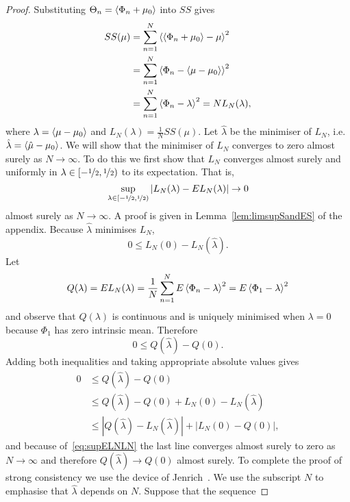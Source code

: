 \documentclass[journal]{../bib/IEEEtran}
\begin{document}
\begin{proof}
Substituting $\Theta_n = \left< \Phi_n + \mu_0 \right>$ into $SS$ gives
\begin{align*}
SS(\mu) &= \sum_{n=1}^{N}{ \left< \left< \Phi_n + \mu_0 \right> - \mu \right>^2 } \\
&= \sum_{n=1}^{N}{ \left< \Phi_n - \left< \mu - \mu_0 \right> \right>^2 } \\
&= \sum_{n=1}^{N}{ \left< \Phi_n - \lambda \right>^2 } = NL_N(\lambda),
\end{align*}
where $\lambda = \left< \mu - \mu_0 \right>$ and $L_N(\lambda) = \tfrac{1}{N}SS(\mu)$. Let $\hat{\lambda}$ be the minimiser of $L_N$, i.e. $\hat{\lambda} = \left< \hat{\mu} - \mu_0 \right>$. We will show that the minimiser of $L_N$ converges to zero almost surely as $N \rightarrow \infty$. To do this we first show that $L_N$ converges almost surely and uniformly in $\lambda \in [-\nicefrac{1}{2}, \nicefrac{1}{2})$ to its expectation. That is,
\begin{equation}\label{eq:supELNLN}
\sup_{\lambda \in [-\nicefrac{1}{2}, \nicefrac{1}{2})}| L_N(\lambda) - EL_N(\lambda) | \rightarrow 0
\end{equation}
almost surely as $N \rightarrow \infty$. A proof is given in Lemma~\ref{lem:limsupSandES} of the appendix. %
Because $\hat{\lambda}$ minimises $L_N$,
\[
0 \leq L_N(0) - L_N(\hat{\lambda}).
\] 
Let
\[
Q(\lambda) = EL_N(\lambda) = \frac{1}{N}\sum_{n=1}^{N}E\left< \Phi_n - \lambda \right>^2 = E\left< \Phi_1 - \lambda \right>^2
\] 
and observe that $Q(\lambda)$ is continuous and is uniquely minimised when $\lambda = 0$ because $\Phi_1$ has zero intrinsic mean. Therefore
\[
0 \leq Q(\hat{\lambda}) - Q(0).
\]
Adding both inequalities and taking appropriate absolute values gives
\begin{align*}
0 &\leq Q(\hat{\lambda}) - Q(0) \\ 
& \leq Q(\hat{\lambda}) - Q(0) + L_N(0) - L_N(\hat{\lambda})\\
& \leq |Q(\hat{\lambda}) - L_N(\hat{\lambda})| + |L_N(0) - Q(0)|,
\end{align*}
and because of~\eqref{eq:supELNLN} the last line converges almost surely to zero as $N \rightarrow \infty$ and therefore $Q(\hat{\lambda}) \rightarrow Q(0)$ almost surely. To complete the proof of strong consistency we use the device of Jenrich~\cite{Jenrich_asymp_nonlin_ulln_1969}. We use the
subscript $N$ to emphasise that $\hat{\lambda}$ depends on $N.$ Suppose that the sequence

\end{proof}
\end{document}
